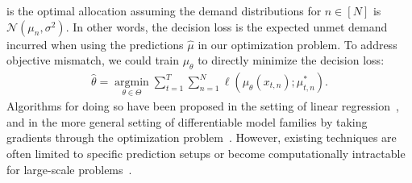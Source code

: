 \documentclass[12pt]{article}
\begin{document}
is the optimal allocation assuming the demand distributions for $n\in[N]$ is $\mathcal{N}(\mu_n,\sigma^2)$. In other words, the decision loss is the expected unmet demand incurred when using the predictions $\hat\mu$ in our optimization problem. To address objective mismatch, we could train $\mu_{\theta}$ to directly minimize the decision loss:
\begin{align*}
\hat\theta=\operatorname*{\arg\min}_{\theta\in\Theta}\sum_{t=1}^T\sum_{n=1}^N\ell(\mu_\theta(x_{t,n});\mu_{t,n}^*).
\end{align*}
Algorithms for doing so have been proposed in the setting of linear regression~\cite{elmachtoub2022smart}, and in the more general setting of differentiable model families by taking gradients through the optimization problem~\cite{wilder2019melding, wang2020automatically}. However, existing techniques are often limited to specific prediction setups or become computationally intractable for large-scale problems~\cite{kallus2022stochastic, wilder2019melding, wang2020automatically}.
\end{document}
